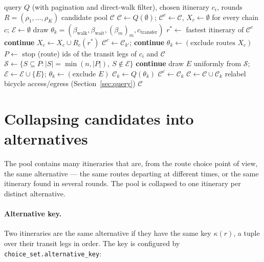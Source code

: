 \documentclass[11pt,a4paper]{article}
\newcommand{\code}[1]{\texttt{#1}}
\newcommand{\cand}{\mathcal{C}}
\newcommand{\key}{\kappa}
\begin{document}
\begin{algorithm}[htbp]
\caption{Candidate generation for one trip $i$}
\label{alg:candidates}
\begin{algorithmic}[1]
\Require query $Q$ (with pagination and direct-walk filter), chosen itinerary $c_i$, rounds $R = (\rho_1,\dots,\rho_K)$
\Ensure candidate pool $\cand$
\State $\cand \gets Q(\emptyset)$; \quad $\cand^{c} \gets \cand$, $X_c \gets \emptyset$ for every chain $c$; \quad $\mathcal{E} \gets \emptyset$
    \State draw $\theta_k = (\beta_{\text{walk}}, \beta_{\text{wait}}, (\beta_m)_{m}, c_{\text{transfer}})$
    \State $r^* \gets$ fastest itinerary of $\cand^{c}$
     \textbf{continue} \EndIf
    \State $X_c \gets X_c \cup R_c(r^*)$
     $\cand^{c} \gets \cand_{k'}$; \textbf{continue} \EndIf
    \State $\theta_k \gets (\text{exclude routes } X_c)$
  \Else {}
    \State $P \gets$ stop (route) ids of the transit legs of $c_i$ and $\cand$
    \State $\mathcal{S} \gets \{ S \subseteq P : |S| = \min(n,|P|),\ S \notin \mathcal{E} \}$
     \textbf{continue} \EndIf
    \State draw $E$ uniformly from $\mathcal{S}$; \quad $\mathcal{E} \gets \mathcal{E} \cup \{E\}$; \quad $\theta_k \gets (\text{exclude } E)$
  \EndIf
  \State $\cand_k \gets Q(\theta_k)$
   $\cand^{c} \gets \cand_k$ \EndIf
  \State $\cand \gets \cand \cup \cand_k$ 
\EndFor
\State relabel bicycle access/egress (Section~\ref{sec:query})
\State \Return $\cand$
\end{algorithmic}
\end{algorithm}

\section{Collapsing candidates into alternatives}
\label{sec:collapse}

The pool contains many itineraries that are, from the route choice point of view, the same
alternative --- the same routes departing at different times, or the same itinerary found in several
rounds. The pool is collapsed to one itinerary per distinct alternative.

\paragraph{Alternative key.} Two itineraries are the same alternative if they have the same key
$\key(r)$, a tuple over their transit legs in order. The key is configured by
\code{choice\_set.alternative\_key}:
\end{document}
